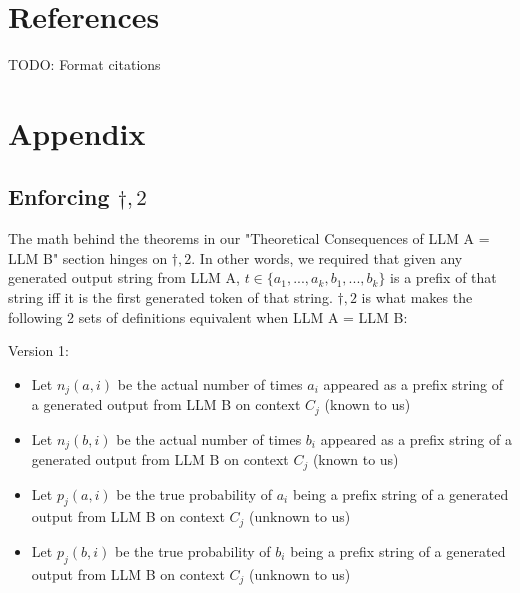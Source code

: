 \documentclass{article}
\begin{document}
\section{References}

TODO: Format citations

\section{Appendix}
\subsection{Enforcing $\dagger,2$}

The math behind the theorems in our "Theoretical Consequences of LLM A = LLM B" section hinges on $\displaystyle \dagger ,2$. In other words, we required that given any generated output string from LLM A, $\displaystyle t\in \{a_{1} ,...,a_{k} ,b_{1} ,...,b_{k}\}$ is a prefix of that string iff it is the first generated token of that string. $\displaystyle \dagger ,2$ is what makes the following 2 sets of definitions equivalent when LLM A = LLM B:



Version 1:
\begin{itemize}
\item Let $\displaystyle n_{j}( a,i)$ be the actual number of times $\displaystyle a_{i}$ appeared as a prefix string of a generated output from LLM B on context $\displaystyle C_{j}$ (known to us)
\item Let $\displaystyle n_{j}( b,i)$ be the actual number of times $\displaystyle b_{i}$ appeared as a prefix string of a generated output from LLM B on context $\displaystyle C_{j}$ (known to us)
\item Let $\displaystyle p_{j}( a,i)$ be the true probability of $\displaystyle a_{i}$ being a prefix string of a generated output from LLM B on context $\displaystyle C_{j}$ (unknown to us)
\item Let $\displaystyle p_{j}( b,i)$ be the true probability of $\displaystyle b_{i}$ being a prefix string of a generated output from LLM B on context $\displaystyle C_{j}$ (unknown to us)
\end{itemize}
\end{document}
